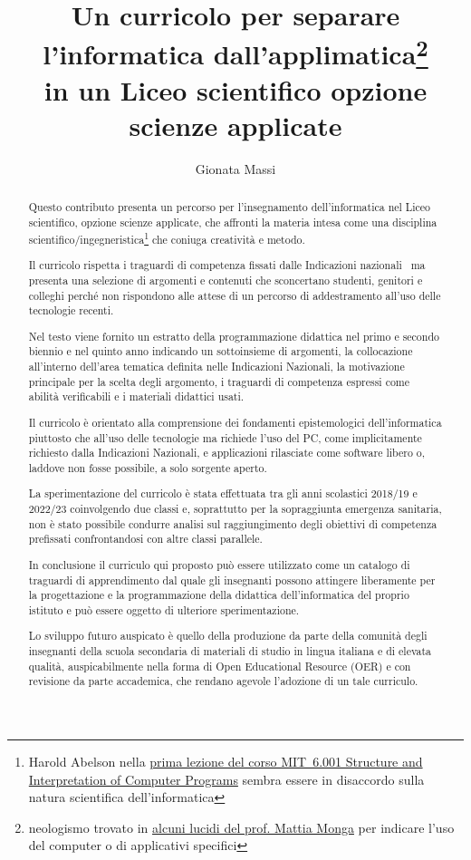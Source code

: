 \documentclass[a4paper]{easychair}
\title{Un curricolo per separare l'informatica dall'applimatica\thanks{neologismo %
trovato in \href{https://aladdin.unimi.it/materiali/talk/2012_mirabilandia.pdf}%
{alcuni lucidi del prof. Mattia Monga} per indicare l'uso del computer o di applicativi specifici}\\ in un %
Liceo scientifico opzione scienze applicate}
\author{
Gionata Massi\institute{
  IIS Savoia Benincasa, Ancona (AN)
 }
}
\institute{
  IIS Savoia Benincasa, Ancona (AN)\\
  \email{gionata.massi@savoiabenincasa.it}
}
\begin{document}
\maketitle

\begin{abstract}
Questo contributo presenta un percorso per l'insegnamento dell'informatica
nel Liceo scientifico, opzione scienze applicate, che affronti la materia intesa come
una disciplina scientifico/ingegneristica\footnote{Harold Abelson nella
\href{https://youtu.be/-J_xL4IGhJA}{prima lezione del corso MIT~6.001
Structure and Interpretation of Computer Programs}
sembra essere in disaccordo sulla natura scientifica dell'informatica
} che coniuga creatività e metodo.

Il curricolo rispetta i traguardi di competenza fissati dalle Indicazioni
nazionali~\cite{IlMinistro2010}
ma presenta una selezione di argomenti e contenuti
che sconcertano studenti, genitori e colleghi perché non rispondono alle attese di un
percorso di addestramento all'uso delle tecnologie recenti.

Nel testo viene fornito un estratto della programmazione didattica nel primo e secondo biennio e nel quinto anno
indicando un sottoinsieme di argomenti,
la collocazione all'interno dell'area tematica definita nelle Indicazioni Nazionali,
la motivazione principale per la scelta degli argomento,
i traguardi di competenza espressi come abilità verificabili e i materiali didattici usati.

Il curricolo è orientato alla comprensione dei fondamenti epistemologici
dell'informatica piuttosto che all'uso delle tecnologie ma richiede l'uso del PC,
come implicitamente richiesto dalla Indicazioni Nazionali, e applicazioni rilasciate
come software libero o, laddove non fosse possibile, a solo sorgente aperto.

La sperimentazione del curricolo è stata effettuata tra gli anni scolastici
2018/19 e 2022/23 coinvolgendo due classi e, soprattutto per la sopraggiunta
emergenza sanitaria, non è stato possibile condurre analisi
sul raggiungimento degli obiettivi di competenza prefissati confrontandosi con altre
classi parallele.

In conclusione il curriculo qui proposto può essere utilizzato come un
catalogo di traguardi di apprendimento dal quale gli insegnanti possono attingere liberamente
per la progettazione e la programmazione della didattica dell'informatica%
del proprio istituto e può essere oggetto di ulteriore sperimentazione.

Lo sviluppo futuro auspicato è quello della produzione da parte della comunità degli insegnanti
della scuola secondaria di materiali di studio in lingua italiana e di elevata qualità,
auspicabilmente nella forma di Open Educational Resource (OER) e con revisione da parte accademica,
che rendano agevole l'adozione di un tale curriculo.
\end{abstract}
\end{document}

